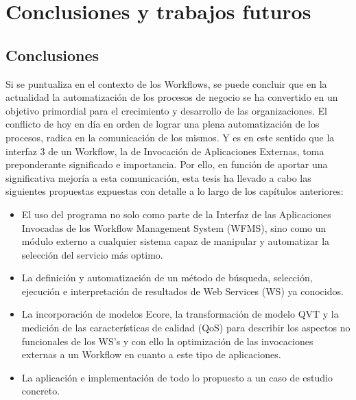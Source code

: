 \chapter{Conclusiones y trabajos futuros}
\label{Conclusiones y trabajos futuros}

\section{Conclusiones}

Si se puntualiza en el contexto de los Workflows, se puede concluir que en la actualidad la automatización de los procesos de negocio se ha convertido en un objetivo primordial para el crecimiento y desarrollo de las organizaciones. El conflicto de hoy en día en orden de lograr una plena automatización de los procesos, radica en la comunicación de los mismos. Y es en este sentido que la interfaz 3 de un Workflow, la de Invocación de Aplicaciones Externas, toma preponderante significado e importancia. Por ello, en función de aportar una significativa mejoría a esta comunicación, esta tesis ha llevado a cabo las siguientes propuestas expuestas con detalle a lo largo de los capítulos anteriores:

\begin{itemize}
	\item El uso del programa no solo como parte de la Interfaz de las Aplicaciones Invocadas de los Workflow Management System (WFMS), sino como un módulo externo a cualquier sistema capaz de manipular y automatizar la selección del servicio más optimo.
	\item La definición y automatización de un método de búsqueda, selección, ejecución e interpretación de resultados de Web Services (WS) ya conocidos.
	\item La incorporación de modelos Ecore, la transformación de modelo QVT y la medición de las características de calidad (QoS) para describir los aspectos no funcionales de los WS's y con ello la optimización de las invocaciones externas a un Workflow en cuanto a este tipo de aplicaciones.	
	\item La aplicación e implementación de todo lo propuesto a un caso de estudio concreto.
\end{itemize}


